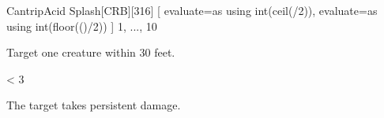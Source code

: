 
\begin{card-collection}{Cantrip}{\level}{Acid Splash}[CRB][316]{
  [
    evaluate=\level as \half using int(ceil(\level/2)),
    evaluate=\level as \dice using int(floor(()/2))
  ] \level
}{1, ..., 10}




Target one creature within 30 feet.

\ifnum \level < 3
\else
{}
\fi

 The target takes  \half{} persistent damage.
\end{card-collection}%


